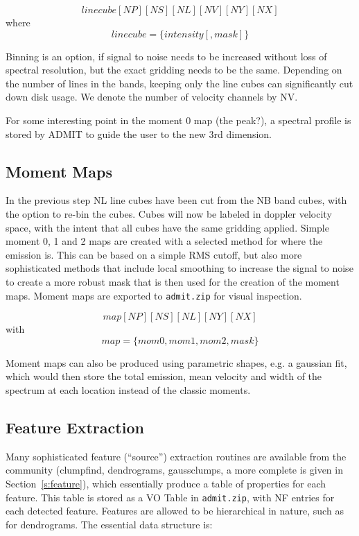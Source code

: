 \documentclass[preprint]{aastex} %
\begin{document}
$$
     linecube[NP][NS][NL][NV][NY][NX]
$$
where 
$$
     linecube = \{ intensity [, mask] \}
$$

Binning is an option, if signal to noise needs to be increased without
loss of spectral resolution, but the exact gridding needs to be 
the same.
Depending on the number of lines in the bands,
keeping only the line cubes can significantly cut down disk usage.
We denote the number of velocity channels by NV. 

For some interesting point in the moment 0 map (the peak?), a spectral profile
is stored by ADMIT to guide the user to the new 3rd dimension.

\subsection{Moment Maps}

In the previous step NL line cubes have been cut from the NB band cubes,
with the option to re-bin the cubes.
Cubes will now be labeled in doppler velocity space, with the intent
that all cubes have the same gridding applied.  Simple moment 0, 1 and 2 maps
are created with a selected method for where the emission is. This can 
be based on a simple RMS cutoff, but also
more sophisticated methods that include local smoothing to
increase the signal to noise to create a more robust mask that is then used
for the creation of the moment maps. Moment maps are exported to {\tt admit.zip}
for visual inspection.

$$
    map[NP][NS][NL][NY][NX]
$$
with
$$
    map = \{mom0, mom1, mom2, mask\}
$$

Moment maps can also be produced using parametric shapes, e.g. a gaussian fit, which
would then store the total emission, mean velocity and width of the spectrum at each
location instead of the classic moments.

\subsection{Feature Extraction}

Many sophisticated feature (``source'') extraction routines are available from the community
(clumpfind, dendrograms, gaussclumps, a more complete is given in Section~\ref{s:feature}),
which essentially produce
a table of properties for each feature. This table is stored as a VO Table 
in {\tt admit.zip}, with NF entries for each  detected feature. Features
are allowed to be hierarchical in nature, such as for dendrograms. 
The essential data structure is:
\end{document}
